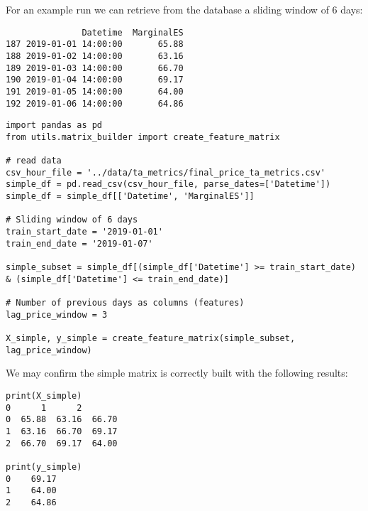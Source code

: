 \documentclass[12pt]{report} %
\begin{document}
For an example run we can retrieve from the database a sliding window of 6 days:
\begin{small}
\begin{verbatim}
               Datetime  MarginalES
187 2019-01-01 14:00:00       65.88
188 2019-01-02 14:00:00       63.16
189 2019-01-03 14:00:00       66.70
190 2019-01-04 14:00:00       69.17
191 2019-01-05 14:00:00       64.00
192 2019-01-06 14:00:00       64.86
\end{verbatim}
\end{small}

\begin{lstlisting}
import pandas as pd
from utils.matrix_builder import create_feature_matrix

# read data
csv_hour_file = '../data/ta_metrics/final_price_ta_metrics.csv'
simple_df = pd.read_csv(csv_hour_file, parse_dates=['Datetime'])
simple_df = simple_df[['Datetime', 'MarginalES']]

# Sliding window of 6 days
train_start_date = '2019-01-01'
train_end_date = '2019-01-07'

simple_subset = simple_df[(simple_df['Datetime'] >= train_start_date) & (simple_df['Datetime'] <= train_end_date)]

# Number of previous days as columns (features)
lag_price_window = 3

X_simple, y_simple = create_feature_matrix(simple_subset, lag_price_window)
\end{lstlisting}

We may confirm the simple matrix is correctly built with the following results:
\begin{small}
\begin{verbatim}
print(X_simple)
0      1      2
0  65.88  63.16  66.70
1  63.16  66.70  69.17
2  66.70  69.17  64.00

print(y_simple)
0    69.17
1    64.00
2    64.86
\end{verbatim}
\end{small}
\end{document}
